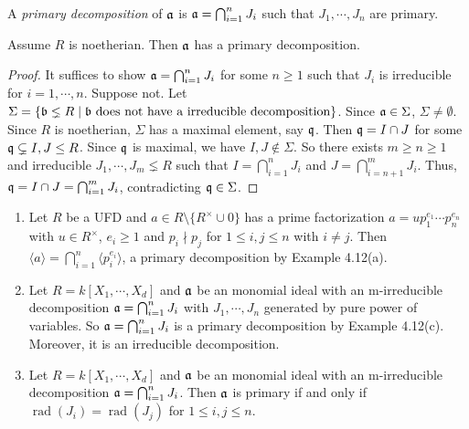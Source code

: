 \begin{definition}
    A \emph{primary decomposition} of $\mathfrak{a}$ is $\mathfrak{a} = \bigcap_{i=1}^{n} J_i$ such that $J_1,\cdots,J_n$ are primary. 
\end{definition}

\begin{theorem}[Noether] 
    Assume $R$ is noetherian. Then $\mathfrak{a}$ has a primary decomposition.
\end{theorem}

\begin{proof}
    It suffices to show $\mathfrak{a} = \bigcap_{i=1}^{n} J_i$ for some $n \geq 1$ such that $J_i$ is irreducible for $i = 1,\cdots,n$. Suppose not. Let $\Sigma = \{\mathfrak{b} \lneq R \mid \mathfrak{b} \text{ does not have a irreducible decomposition}\}$. Since $\mathfrak{a} \in \Sigma$, $\Sigma \neq \emptyset$. Since $R$ is noetherian, $\Sigma$ has a maximal element, say $\mathfrak{q}$. Then $\mathfrak{q} = I \cap J$ for some $\mathfrak{q} \subsetneq I,J \leq R$. Since $\mathfrak{q}$ is maximal, we have $I,J \not \in \Sigma$. So there exists $m \geq n \geq 1$ and irreducible $J_1,\cdots,J_m \lneq R$ such that $I = \bigcap_{i=1}^{n}J_i$ and $J = \bigcap_{i=n+1}^{m} J_i$. Thus, $\mathfrak{q} = I \cap J = \bigcap_{i=1}^{m} J_i$, contradicting $\mathfrak{q} \in \Sigma$.
\end{proof}

\begin{example}
    \begin{enumerate}
        \item Let $R$ be a UFD and $a \in R \setminus \{R^{\times} \cup 0\}$ has a prime factorization $a = up_1^{e_1} \cdots p_n^{e_n}$ with $u \in R^{\times}$, $e_i \geq 1$ and $p_i \nmid p_j$ for $1 \leq i,j \leq n$ with $i \neq j$. Then $\langle a \rangle = \bigcap_{i=1}^{n} \langle p_i^{e_i} \rangle$, a primary decomposition by Example 4.12(a). 
        \item Let $R = k[X_1,\cdots,X_d]$ and $\mathfrak{a}$ be an monomial ideal with an m-irreducible decomposition $\mathfrak{a} = \bigcap_{i=1}^{n}J_i$ with $J_1,\cdots,J_n$ generated by pure power of variables. So $\mathfrak{a} = \bigcap_{i=1}^{n} J_i$ is a primary decomposition by Example 4.12(c). Moreover, it is an irreducible decomposition.
        \item Let $R = k[X_1,\cdots,X_d]$ and $\mathfrak{a}$ be an monomial ideal with an m-irreducible decomposition $\mathfrak{a} = \bigcap_{i=1}^{n}J_i$. Then $\mathfrak{a}$ is primary if and only if $\operatorname{rad}(J_i) = \operatorname{rad}(J_j)$ for $1 \leq i,j \leq n$.
    \end{enumerate}
\end{example}

